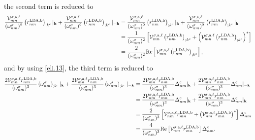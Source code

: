 the second term is reduced to
\begin{align}\label{second_term_gen_deriv}
    \frac{\mathcal{V}^{\sigma,\text{a},\ell}_{mn}}{(\omega^{\sigma}_{nm})^{2}}
    \left(r^{\text{LDA,b}}_{nm}\right)_{;k^{\text{c}}}|_{\mathbf{k}}
+   \frac{\mathcal{V}^{\sigma,\text{a},\ell}_{mn}}{(\omega^{\sigma}_{nm})^{2}}
    \left(r^{\text{LDA,b}}_{nm}\right)_{;k^{\text{c}}}|_{-\mathbf{k}}
&=  \frac{\mathcal{V}^{\sigma,\text{a},\ell}_{mn}}{(\omega^{\sigma}_{nm})^{2}}
    \left(r^{\text{LDA,b}}_{nm}\right)_{;k^{\text{c}}}|_{\mathbf{k}}
+   \frac{\mathcal{V}^{\sigma,\text{a},\ell}_{nm}}{(\omega^{\sigma}_{nm})^{2}}
    \left(r^{\text{LDA,b}}_{mn}\right)_{;k^{\text{c}}}|_{\mathbf{k}}\nonumber\\
&=  \frac{1}{(\omega^{\sigma}_{nm})^{2}}
    \left[\mathcal{V}^{\sigma,\text{a},\ell}_{mn}
    \left(r^{\text{LDA,b}}_{nm}\right)_{;k^{\text{c}}}
+   \left(\mathcal{V}^{\sigma,\text{a},\ell}_{mn}
    \left(r^{\text{LDA,b}}_{nm}\right)_{;k^{\text{c}}}\right)^*\right]
    \nonumber\\
&=  \frac{2}{(\omega^{\sigma}_{nm})^{2}}\mathrm{Re}
    \left[\mathcal{V}^{\sigma,\text{a},\ell}_{mn}
    \left(r^{\text{LDA,b}}_{nm}\right)_{;k^{\text{c}}}\right]
,
\end{align}
and by using \eqref{eli.13}, the third term is reduced to
\begin{align}\label{third_term_gen_deriv}
    \frac{2\mathcal{V}^{\sigma,\text{a},\ell}_{mn}
    r^{\text{LDA,b}}_{nm}}{(\omega^{\sigma}_{nm})^{3}}
    \left(\omega^{\sigma}_{nm}\right)_{;k^{\text{c}}}|_{\mathbf{k}}
+   \frac{2\mathcal{V}^{\sigma,\text{a},\ell}_{mn}
    r^{\text{LDA,b}}_{nm}}{(\omega^{\sigma}_{nm})^{3}}
    \left(\omega^{\sigma}_{nm}\right)_{;k^{\text{c}}}|_{-\mathbf{k}}
&=  \frac{2\mathcal{V}^{\sigma,\text{a},\ell}_{mn}
    r^{\text{LDA,b}}_{nm}}{(\omega^{\sigma}_{nm})^{3}}
    \Delta_{nm}^{\text{c}}|_{\mathbf{k}}
+   \frac{2\mathcal{V}^{\sigma,\text{a},\ell}_{mn}
    r^{\text{LDA,b}}_{nm}}{(\omega^{\sigma}_{nm})^{3}}
    \Delta_{nm}^{\text{c}}|_{-\mathbf{k}}\nonumber\\
&=  \frac{2\mathcal{V}^{\sigma,\text{a},\ell}_{nm}
    r^{\text{LDA,b}}_{mn}}{(\omega^{\sigma}_{nm})^{3}}
    \Delta_{nm}^{\text{c}}|_{\mathbf{k}}
+   \frac{2\mathcal{V}^{\sigma,\text{a},\ell}_{mn}
    r^{\text{LDA,b}}_{nm}}{(\omega^{\sigma}_{nm})^{3}}
    \Delta_{nm}^{\text{c}}|_{\mathbf{k}}\nonumber\\
&=  \frac{2}{(\omega^{\sigma}_{nm})^{3}}
    \left[\mathcal{V}^{\sigma,\text{a},\ell}_{nm}r^{\text{LDA,b}}_{mn}
+   \left(\mathcal{V}^{\sigma,\text{a},\ell}_{nm}
    r^{\text{LDA,b}}_{mn}\right)^{*}\right]\Delta_{nm}^{\text{c}}\nonumber\\
&=  \frac{4}{(\omega^{\sigma}_{nm})^{3}}\mathrm{Re}
    \left[\mathcal{V}^{\sigma,\text{a},\ell}_{nm}r^{\text{LDA,b}}_{mn}\right]
    \Delta_{nm}^{\text{c}}
.
\end{align}


